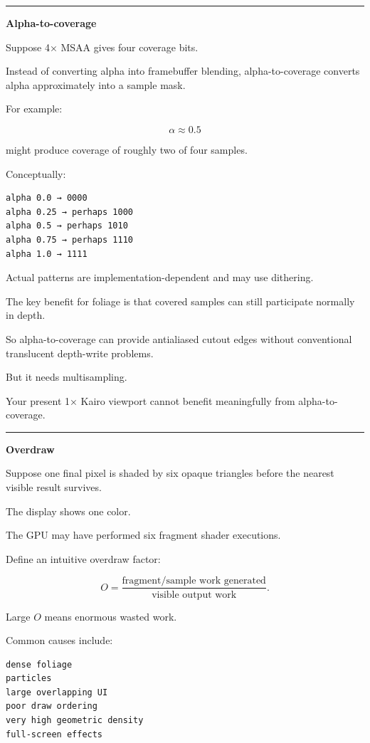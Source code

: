 \begin{center}\rule{0.5\linewidth}{0.5pt}\end{center}

\textbf{Alpha-to-coverage}

Suppose 4× MSAA gives four coverage bits.

Instead of converting alpha into framebuffer blending, alpha-to-coverage converts alpha approximately into a sample mask.

For example:

\[
\alpha\approx0.5
\]

might produce coverage of roughly two of four samples.

Conceptually:

\begin{verbatim}
alpha 0.0 → 0000
alpha 0.25 → perhaps 1000
alpha 0.5 → perhaps 1010
alpha 0.75 → perhaps 1110
alpha 1.0 → 1111
\end{verbatim}

Actual patterns are implementation-dependent and may use dithering.

The key benefit for foliage is that covered samples can still participate normally in depth.

So alpha-to-coverage can provide antialiased cutout edges without conventional translucent depth-write problems.

But it needs multisampling.

Your present 1× Kairo viewport cannot benefit meaningfully from alpha-to-coverage.

\begin{center}\rule{0.5\linewidth}{0.5pt}\end{center}

\textbf{Overdraw}

Suppose one final pixel is shaded by six opaque triangles before the nearest visible result survives.

The display shows one color.

The GPU may have performed six fragment shader executions.

Define an intuitive overdraw factor:

\[
O=
\frac{\text{fragment/sample work generated}}
{\text{visible output work}}.
\]

Large \(O\) means enormous wasted work.

Common causes include:

\begin{verbatim}
dense foliage
particles
large overlapping UI
poor draw ordering
very high geometric density
full-screen effects
\end{verbatim}

